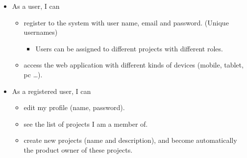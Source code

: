 \documentclass[
	accentcolor=tud1a %
]{tudreport}
\begin{document}
{
\small
\begin{itemize}
	\item As a user, I can
	\begin{itemize}
		\item register to the system with user name, email and password. (Unique usernames)
		\begin{itemize}
			\item Users can be assigned to different projects with different roles.
		\end{itemize}
		\item access the web application with different kinds of devices (mobile, tablet, pc \ldots).
	\end{itemize}
	
	\item As a registered user, I can
	\begin{itemize}
		\item edit my profile (name, password).
		\item see the list of projects I am a member of.
		\item create new projects (name and description), and become automatically the product owner of these projects.
	\end{itemize}


\end{itemize}}
\end{document}
